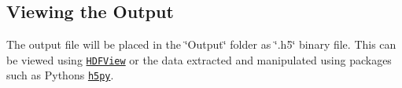 \subsection*{Viewing the Output}

The output file will be placed in the \char`\"{}\+Output\char`\"{} folder as \char`\"{}.\+h5\char`\"{} binary file. This can be viewed using \href{https://support.hdfgroup.org/products/java/hdfview/}{\tt H\+D\+F\+View} or the data extracted and manipulated using packages such as Python\textquotesingle{}s \href{https://www.h5py.org}{\tt h5py}. 